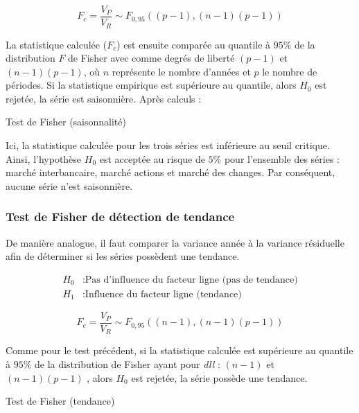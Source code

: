 \begin{equation*}
       F_{c} = \frac{V_{P}}{V_{R}} \sim F_{0,95}((p-1), (n-1)(p-1))
\end{equation*}

La statistique calculée ($F_{c}$) est ensuite comparée au quantile à $95\%$ de la distribution $F$ de Fisher avec comme degrés de liberté $(p-1)$ et $(n-1)(p-1)$, où $n$ représente le nombre d'années et $p$ le nombre de périodes. Si la statistique empirique est supérieure au quantile, alors $ H_{0} $ est rejetée, la série est saisonnière. Après calculs :

\begin{table}[H]
    \centering
    \caption{Test de Fisher (saisonnalité)}
    \sffamily
    
\end{table}

Ici, la statistique calculée pour les trois séries est inférieure au seuil critique. Ainsi, l'hypothèse $H_{0}$ est acceptée au risque de $5\%$ pour l'ensemble des séries : marché interbancaire, marché actions et marché des changes. Par conséquent, aucune série n'est saisonnière.

\subsubsection*{Test de Fisher de détection de tendance}

De manière analogue, il faut comparer la variance année à la variance résiduelle afin de déterminer si les séries possèdent une tendance.

\begin{equation*}
    \begin{split}
        H_{0} &: \text{Pas d'influence du facteur ligne (pas de tendance)} \\
        H_{1} &: \text{Influence du facteur ligne (tendance)}
    \end{split}
\end{equation*}

\begin{equation*}
       F_{c} = \frac{V_{P}}{V_{R}} \sim F_{0,95}((n-1), (n-1)(p-1))
\end{equation*}

Comme pour le test précédent, si la statistique calculée est supérieure au quantile à $ 95\% $ 
de la distribution de Fisher ayant pour \textit{dll} : $(n-1)$ et $(n-1)(p-1)$ , alors $ H_{0} $ est rejetée, la série possède une tendance.

\begin{table}[H]
    \centering
    \caption{Test de Fisher (tendance)}
    \sffamily
    
\end{table}

